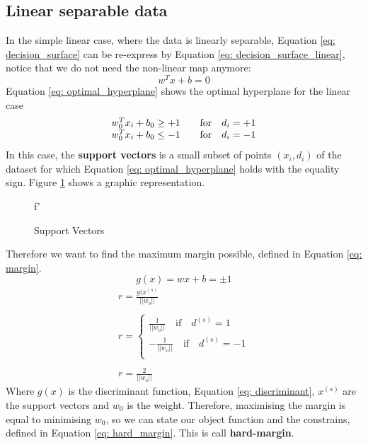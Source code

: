 \documentclass[11pt]{article}
\begin{document}
\subsection{Linear separable data}
In the simple linear case, where the data is linearly separable, Equation \ref{eq: decision_surface} can be re-express by Equation \ref{eq: decision_surface_linear}, notice that we do not need the non-linear map anymore:
\begin{equation}
    w^Tx + b= 0	
    \label{eq: decision_surface_linear}
\end{equation}
Equation \ref{eq: optimal_hyperplane} shows the optimal hyperplane for the linear case
\begin{equation}
    \begin{array}{r c l}
w^T_0x_i + b_0 \ge +1 && \text{for} \quad d_i = + 1  \\
w^T_0x_i + b_0  \le -1 && \text{for} \quad   d_i = - 1 
\end{array}
   \label{eq: optimal_hyperplane}
\end{equation}
In this case, the \textbf{support vectors} is a small subset of points $(x_i,d_i)$ of the dataset for which Equation \ref{eq: optimal_hyperplane} holds with the equality sign. Figure \ref{fig: support_vector} shows a graphic representation. 
\begin{figure}[H]
\centering
f'
\caption{Support Vectors}
\label{fig: support_vector}
\end{figure}
Therefore we want to find the maximum margin possible, defined in Equation \ref{eq: margin}.
\begin{equation}
g(x) = w x + b = \pm 1
\label{eq: discriminant}
\end{equation}
\begin{equation}
\begin{matrix}
r = \frac{g(x^{(s)}}{||w_o||} \\ 
\\
r =  \left  \{
 \begin{matrix}
  \frac{1}{||w_o||} \quad \text{if} \quad d^{(s)} = 1\\
  - \frac{1}{||w_o||} \quad \text{if} \quad d^{(s)} = -1 \\
  \end{matrix}	\\
\\
r = \frac{2}{||w_o||}
\end{matrix}
\label{eq: margin}
\end{equation}
Where $g(x)$ is the discriminant function, Equation \ref{eq: discriminant}, $x^(s)$ are the support vectors and $w_0$ is the  weight. Therefore, maximising the margin is equal to minimising $w_0$, so we can state our object function and the constrains, defined in Equation \ref{eq: hard_margin}. This is call \textbf{hard-margin}.
\end{document}
